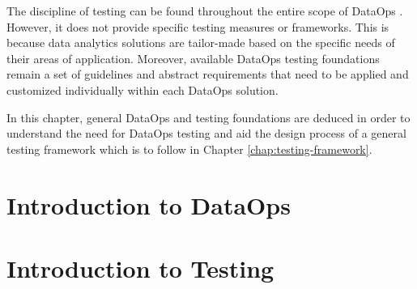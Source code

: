 
The discipline of testing can be found throughout the entire scope of DataOps \cite[42]{Schmidt2019}. However, it does not provide specific testing measures or frameworks. This is because data analytics solutions are tailor-made based on the specific needs of their areas of application. Moreover, available DataOps testing foundations remain a set of guidelines and abstract requirements that need to be applied and customized individually within each DataOps solution.

In this chapter, general DataOps and testing foundations are deduced in order to understand the need for DataOps testing and aid the design process of a general testing framework which is to follow in Chapter \ref{chap:testing-framework}.


\section{Introduction to DataOps}
	\label{sec:2-dataops}
    
    

\section{Introduction to Testing}
	\label{sec:2-testing}
    


